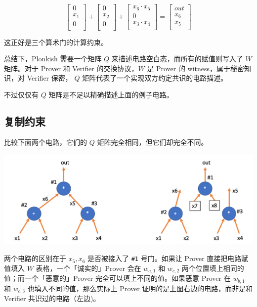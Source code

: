 \[
\left[
\begin{array}{c}
0 \\
x_1 \\
0\\
\end{array}
\right]
+
\left[
\begin{array}{c}
0 \\
x_2 \\
0\\
\end{array}
\right]
+
\left[
\begin{array}{c}
x_6\cdot x_5 \\
0 \\
x_3\cdot x_4\\
\end{array}
\right]=\left[
\begin{array}{c}
out \\
x_6 \\
x_5\\
\end{array}
\right]
\]

这正好是三个算术门的计算约束。

总结下，Plonkish 需要一个矩阵 \(Q\)
来描述电路空白态，而所有的赋值则写入了 \(W\) 矩阵。对于 Prover 和
Verifier 的交换协议，\(W\) 是 Prover 的 witness，属于秘密知识，对
Verifier 保密， \(Q\) 矩阵代表了一个实现双方约定共识的电路描述。

不过仅仅有 \(Q\) 矩阵是不足以精确描述上面的例子电路。

\hypertarget{ux590dux5236ux7ea6ux675f}{%
\subsection{复制约束}\label{ux590dux5236ux7ea6ux675f}}

比较下面两个电路，它们的 \(Q\) 矩阵完全相同，但它们却完全不同。

\includegraphics{img/img20230414205219.png}

两个电路的区别在于 \(x_5, x_6\) 是否被接入了 \texttt{\#1} 号门。如果让
Prover 直接把电路赋值填入 \(W\) 表格，一个「诚实的」Prover 会在
\(w_{a,1}\) 和 \(w_{c,2}\) 两个位置填上相同的值；而一个「恶意的」Prover
完全可以填上不同的值。如果恶意 Prover 在 \(w_{b,1}\) 和 \(w_{c,3}\)
也填入不同的值，那么实际上 Prover 证明的是上图右边的电路，而非是和
Verifier 共识过的电路（左边)。

